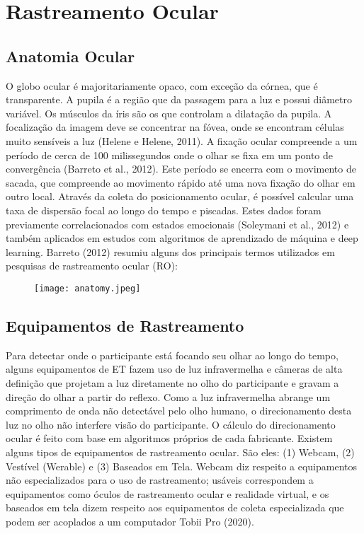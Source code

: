\chapter{Rastreamento Ocular}

\section{Anatomia Ocular}
O globo ocular é majoritariamente opaco, com exceção da córnea, que é transparente. 
A pupila é a região que da passagem para a luz e possui diâmetro variável. Os músculos da íris são os que controlam a dilatação da pupila. 
A focalização da imagem deve se concentrar na fóvea, onde se encontram células muito sensíveis a luz (Helene e Helene, 2011). 
A fixação ocular compreende a um período de cerca de 100 milissegundos onde o olhar se fixa em um ponto de convergência (Barreto et al., 2012). 
Este período se encerra com o movimento de sacada, que compreende ao movimento rápido até uma nova fixação do olhar em outro local.
Através da coleta do posicionamento ocular, é possível calcular uma taxa de dispersão focal ao longo do tempo e piscadas. 
Estes dados foram previamente correlacionados com estados emocionais (Soleymani et al., 2012) e 
também aplicados em estudos com algoritmos de aprendizado de máquina e deep learning. Barreto (2012)
resumiu alguns dos principais termos utilizados em pesquisas de rastreamento ocular (RO):

\begin{figure}[h]
    \centering
    \texttt{[image: anatomy.jpeg]}
    \caption[]{}\label{fig:}
    \end{figure}

\section{Equipamentos de Rastreamento}
Para detectar onde o participante está focando seu olhar ao longo do tempo, alguns equipamentos de ET
 fazem uso de luz infravermelha e câmeras de alta definição que projetam a luz
  diretamente no olho do participante e gravam a direção do olhar a partir do reflexo. 
  Como a luz infravermelha abrange um comprimento de onda não detectável pelo olho humano, 
  o direcionamento desta luz no olho não interfere visão do participante. 
  O cálculo do direcionamento ocular é feito com base em algoritmos próprios de cada fabricante. 
  Existem alguns tipos de equipamentos de rastreamento ocular. São eles: (1) Webcam, (2) Vestível (Werable) e (3) Baseados em Tela. 
  Webcam diz respeito a equipamentos não especializados para o uso de rastreamento; usáveis correspondem a equipamentos como óculos de rastreamento ocular 
  e realidade virtual, e os baseados em tela dizem respeito aos equipamentos de coleta especializada que podem ser acoplados a um computador Tobii Pro (2020).
